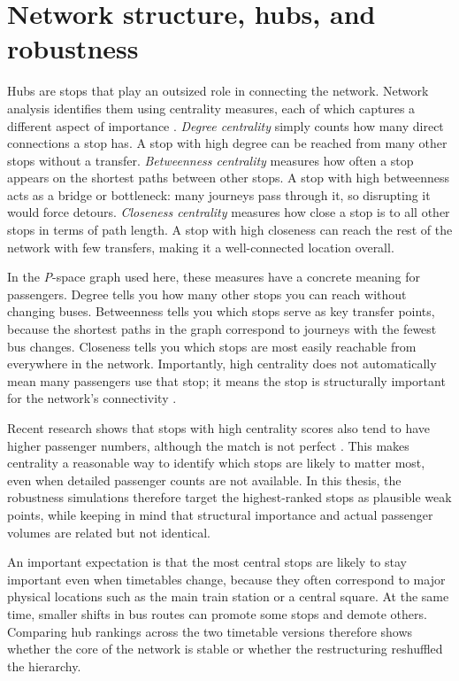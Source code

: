 \documentclass[12pt,a4paper,oneside]{report}
\newcommand{\pspace}{\textit{P}-space}
\begin{document}
\section{Network structure, hubs, and robustness}\label{sec:hubs-centrality}

Hubs are stops that play an outsized role in connecting the network.
Network analysis identifies them using centrality measures, each of which captures a different aspect of importance \citep{barthelemy2011}.
\emph{Degree centrality} simply counts how many direct connections a stop has.
A stop with high degree can be reached from many other stops without a transfer.
\emph{Betweenness centrality} measures how often a stop appears on the shortest paths between other stops.
A stop with high betweenness acts as a bridge or bottleneck: many journeys pass through it, so disrupting it would force detours.
\emph{Closeness centrality} measures how close a stop is to all other stops in terms of path length.
A stop with high closeness can reach the rest of the network with few transfers, making it a well-connected location overall.

In the \pspace{} graph used here, these measures have a concrete meaning for passengers.
Degree tells you how many other stops you can reach without changing buses.
Betweenness tells you which stops serve as key transfer points, because the shortest paths in the graph correspond to journeys with the fewest bus changes.
Closeness tells you which stops are most easily reachable from everywhere in the network.
Importantly, high centrality does not automatically mean many passengers use that stop; it means the stop is structurally important for the network's connectivity \citep{shanmukhappa2019,derrible2010}.

Recent research shows that stops with high centrality scores also tend to have higher passenger numbers, although the match is not perfect \citep{sfiligoj2025}.
This makes centrality a reasonable way to identify which stops are likely to matter most, even when detailed passenger counts are not available.
In this thesis, the robustness simulations therefore target the highest-ranked stops as plausible weak points, while keeping in mind that structural importance and actual passenger volumes are related but not identical.

An important expectation is that the most central stops are likely to stay important even when timetables change, because they often correspond to major physical locations such as the main train station or a central square.
At the same time, smaller shifts in bus routes can promote some stops and demote others.
Comparing hub rankings across the two timetable versions therefore shows whether the core of the network is stable or whether the restructuring reshuffled the hierarchy.
\end{document}
